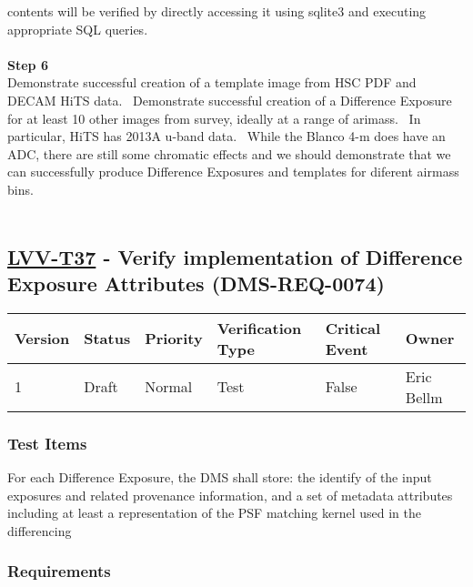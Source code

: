 contents will be verified by directly accessing it using sqlite3 and
executing appropriate SQL queries.\\
~\\
\textbf{Step 6}\\
Demonstrate successful creation of a template image from HSC PDF and
DECAM HiTS data. ~Demonstrate successful creation of a Difference
Exposure for at least 10 other images from survey, ideally at a range of
arimass. ~In particular, HiTS has 2013A u-band data. ~While the Blanco
4-m does have an ADC, there are still some chromatic effects and we
should demonstrate that we can successfully produce Difference Exposures
and templates for diferent airmass bins.\\
~\\

\hypertarget{lvv-t37---verify-implementation-of-difference-exposure-attributes-dms-req-0074}{%
\subsection{\texorpdfstring{\href{https://jira.lsstcorp.org/secure/Tests.jspa\#/testCase/LVV-T37}{LVV-T37}
- Verify implementation of Difference Exposure Attributes
(DMS-REQ-0074)}{LVV-T37 - Verify implementation of Difference Exposure Attributes (DMS-REQ-0074)}}\label{lvv-t37---verify-implementation-of-difference-exposure-attributes-dms-req-0074}}

\begin{longtable}[]{@{}llllll@{}}
\toprule
Version & Status & Priority & Verification Type & Critical Event &
Owner\tabularnewline
\midrule
\endhead
1 & Draft & Normal & Test & False & Eric Bellm\tabularnewline
\bottomrule
\end{longtable}

\hypertarget{test-items-126}{%
\subsubsection{Test Items}\label{test-items-126}}

For each Difference Exposure, the DMS shall store: the identify of the
input exposures and related provenance information, and a set of
metadata attributes including at least a representation of the PSF
matching kernel used in the differencing

\hypertarget{requirements-127}{%
\subsubsection{Requirements}\label{requirements-127}}

